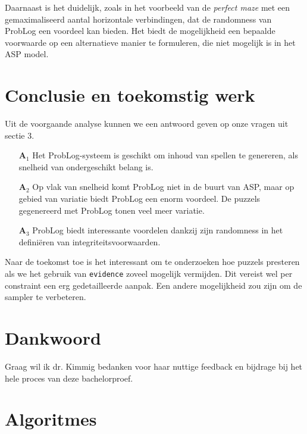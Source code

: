 \documentclass{article}
\begin{document}
	Daarnaast is het duidelijk, zoals in het voorbeeld van de \textit{perfect maze} met een gemaximaliseerd aantal horizontale verbindingen, dat de randomness van ProbLog een voordeel kan bieden. Het biedt de mogelijkheid een bepaalde voorwaarde op een alternatieve manier te formuleren, die niet mogelijk is in het ASP model.
	
\section{Conclusie en toekomstig werk}
Uit de voorgaande analyse kunnen we een antwoord geven op onze vragen uit sectie 3. 
\begin{itemize}[leftmargin=6mm]
\item[\textbf{A$_1$}] Het ProbLog-systeem is geschikt om inhoud van spellen te genereren, als snelheid van ondergeschikt belang is. 
\item[\textbf{A$_2$}] Op vlak van snelheid komt ProbLog niet in de buurt van ASP, maar op gebied van variatie biedt ProbLog een enorm voordeel. De puzzels gegenereerd met ProbLog tonen veel meer variatie.
\item[\textbf{A$_3$}] ProbLog biedt interessante voordelen dankzij zijn randomness in het defini\"eren van integriteitsvoorwaarden.
\end{itemize}

Naar de toekomst toe is het interessant om te onderzoeken hoe puzzels presteren als we het gebruik van \texttt{evidence} zoveel mogelijk vermijden. Dit vereist wel per constraint een erg gedetailleerde aanpak. Een andere mogelijkheid zou zijn om de sampler te verbeteren.

\section*{Dankwoord}
Graag wil ik dr. Kimmig bedanken voor haar nuttige feedback en bijdrage bij het hele proces van deze bachelorproef.





\newpage

\appendix
\section{Algoritmes}
\end{document}
